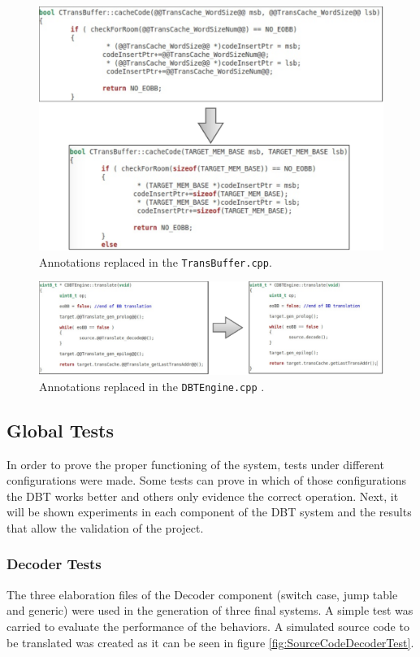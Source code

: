 \begin{figure}[H]
\centerline{
\includegraphics[scale=0.5]{images/annotation_test2}
}
\caption{Annotations replaced in the \texttt{TransBuffer.cpp}.}
\label{fig:annotation_test2}
\end{figure}

\begin{figure}[H]
\centerline{
\includegraphics[scale=0.5]{images/annotation_test3}
}
\caption{Annotations replaced in the \texttt{DBTEngine.cpp} .}
\label{fig:annotation_test3}
\end{figure}

\subsection{Global Tests}

In order to prove the proper functioning of the system, tests under different configurations were made. Some tests can prove in which of those configurations the DBT works better and others only evidence the correct operation. 
Next, it will be shown experiments in each component of the DBT system and the results that allow the validation of the project.

\subsubsection{Decoder Tests}
The three elaboration files of the Decoder component (switch case, jump table and generic) were used in the generation of three final systems. A simple test was carried to evaluate the performance of the behaviors. A simulated source code to be translated was created as it can be seen in figure \ref{fig:SourceCodeDecoderTest}.

